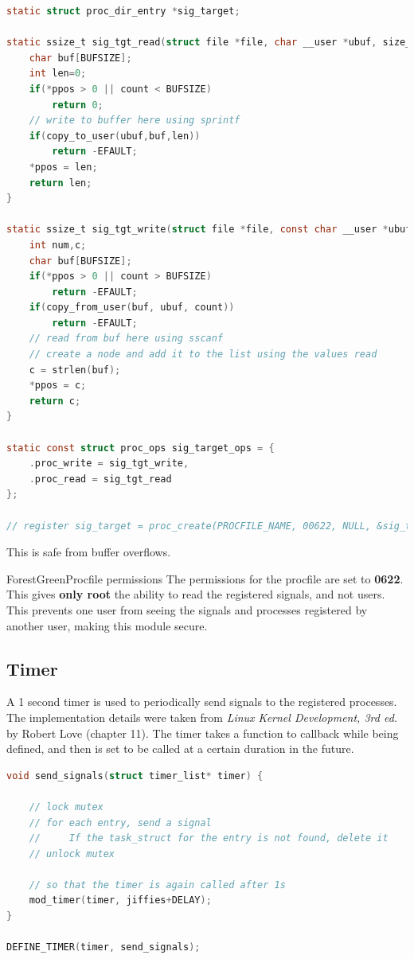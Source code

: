 \documentclass[12pt]{article}
\begin{document}
\begin{lstlisting}[language=C]
static struct proc_dir_entry *sig_target;

static ssize_t sig_tgt_read(struct file *file, char __user *ubuf, size_t count, loff_t *ppos) {
    char buf[BUFSIZE];
    int len=0;
    if(*ppos > 0 || count < BUFSIZE)
    	return 0;
    // write to buffer here using sprintf
    if(copy_to_user(ubuf,buf,len))
    	return -EFAULT;
    *ppos = len;
    return len;
}

static ssize_t sig_tgt_write(struct file *file, const char __user *ubuf, size_t count, loff_t *ppos) {
    int num,c;
    char buf[BUFSIZE];
    if(*ppos > 0 || count > BUFSIZE)
    	return -EFAULT;
    if(copy_from_user(buf, ubuf, count))
    	return -EFAULT;
    // read from buf here using sscanf
    // create a node and add it to the list using the values read
    c = strlen(buf);
    *ppos = c;
    return c;
}

static const struct proc_ops sig_target_ops = {
    .proc_write = sig_tgt_write,
    .proc_read = sig_tgt_read
};

// register sig_target = proc_create(PROCFILE_NAME, 00622, NULL, &sig_target_ops);
\end{lstlisting}

This is safe from buffer overflows.

\begin{mybox}{ForestGreen}{Procfile permissions}
The permissions for the procfile are set to \textbf{0622}. This gives \textbf{only root}
the ability to read the registered signals, and not users. This prevents one
user from seeing the signals and processes registered by another user, making
this module secure.
\end{mybox}

\subsection{Timer}

A 1 second timer is used to periodically send signals to the registered processes.
The implementation details were taken from \textit{Linux Kernel Development, 3rd ed.}
by Robert Love (chapter 11). The timer takes a function to callback while being
defined, and then is set to be called at a certain duration in the future. 

\begin{lstlisting}[language=C]
void send_signals(struct timer_list* timer) {

    // lock mutex
    // for each entry, send a signal
    //     If the task_struct for the entry is not found, delete it
    // unlock mutex

    // so that the timer is again called after 1s
    mod_timer(timer, jiffies+DELAY);
}

DEFINE_TIMER(timer, send_signals);

\end{lstlisting}
\end{document}
